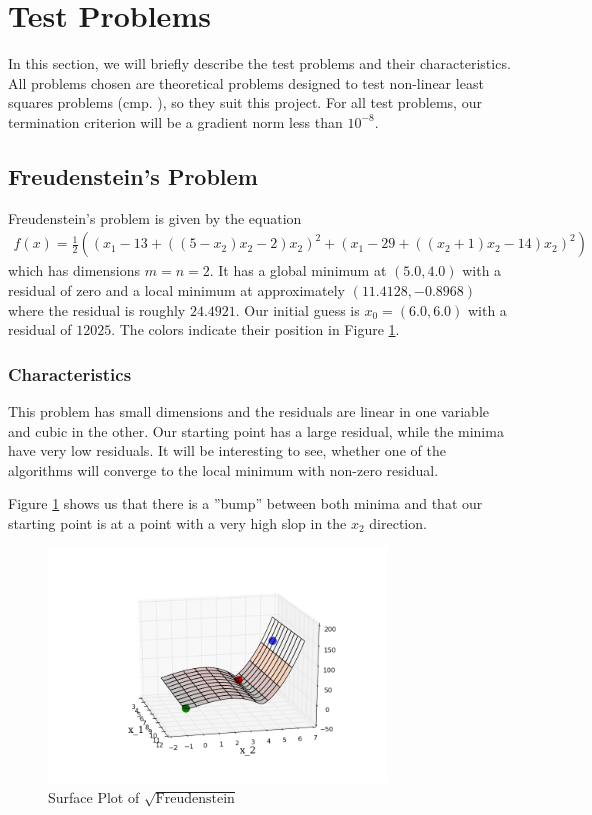 \documentclass{article}
\theoremstyle{plain}%
\theoremstyle{definition}
\begin{document}
\section{Test Problems}
In this section, we will briefly describe the test problems and their characteristics.
All problems chosen are theoretical problems designed to test non-linear least squares problems
(cmp. \cite{Brown1971}), so they suit this project. For all test problems, our termination
criterion will be a gradient norm less than $10^{-8}$.
\subsection{Freudenstein's Problem}
Freudenstein's problem is given by the equation 
\begin{align*}
   f(x)=\frac{1}{2}((x_1-13+((5-x_2)x_2-2)x_2)^2+(x_1-29+((x_2+1)x_2-14)x_2)^2)
\end{align*}
which has dimensions $m=n=2$. It has a global minimum at {\color{red}$(5.0,4.0)$} with a residual of zero and 
a local minimum at approximately {\color{green}$(11.4128,-0.8968)$} where the residual is roughly $24.4921$.
Our initial guess is {\color{blue}$x_0=(6.0,6.0)$} with a residual of $12025$. The colors indicate their position in
Figure \ref{surface}.
\subsubsection{Characteristics}
This problem has small dimensions and the residuals are linear in one variable and cubic in the
other. Our starting point has a large residual, while the minima have very low residuals.
It will be interesting to see, whether one of the algorithms will converge to the local
minimum with non-zero residual.\par
Figure \ref{surface} shows us that there is a ''bump'' between both minima and that
our starting point is at a point with a very high slop in the $x_2$ direction.
\begin{figure}
    \centering
        \includegraphics[width=0.8\textwidth]{contour_freudenstein.png}
        \caption{Surface Plot of $\sqrt{\text{Freudenstein}}$}
        \label{surface}
\end{figure}
\end{document}
